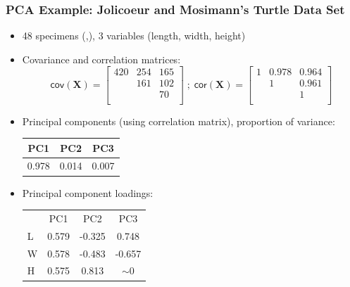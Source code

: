 \documentclass{beamer}
\newcommand{\Mtx}[1]{\ensuremath{\mathbf{#1}}}
\begin{document}

\begin{frame}
  \frametitle{PCA Example: Jolicoeur and Mosimann's Turtle Data Set}

\begin{itemize}
\item 48 specimens (\Male,\Female), 3 variables (length, width, height)

\item Covariance and correlation matrices:
\footnotesize{
\[
\mathsf{cov}(\Mtx{X}) = \left[ \begin{array}{rrr}
420 & 254 & 165 \\
       & 161 & 102 \\
       &        &   70\\
\end{array}
\right]
\;
;
\;
\mathsf{cor}(\Mtx{X}) = \left[ \begin{array}{ccc}
1 & 0.978 & 0.964 \\
       & 1 & 0.961\\
       &        &   1\\
\end{array}
\right]
\]
} %

\item Principal components (using correlation matrix), proportion of variance:

{\small
\begin{center}
\begin{tabular}{ccc}
PC1 & PC2 & PC3 \\ \hline
0.978 & 0.014 & 0.007
\end{tabular}
\end{center}
} %

\item Principal component loadings:

{\small
\begin{center}
\begin{tabular}{lccc}
&PC1 & PC2 & PC3 \\ \cline{2-4}
L & 0.579 & -0.325 & 0.748 \\
W & 0.578 & -0.483 & -0.657 \\
H & 0.575 & 0.813 & $\sim$0 \\
\end{tabular}
\end{center}
} %



\end{itemize}


\end{frame}
\end{document}
